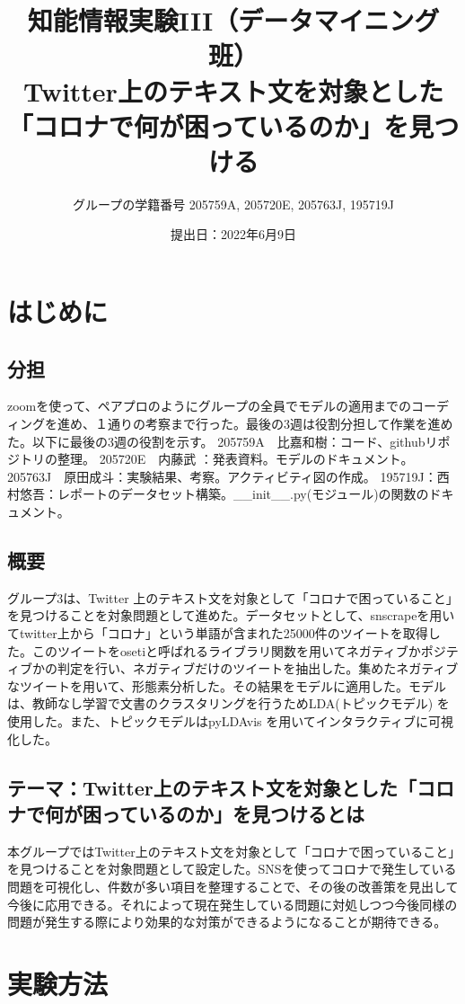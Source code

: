 \documentclass[a4paper, 11pt, titlepage]{jsarticle}
\title{知能情報実験III（データマイニング班）\\Twitter上のテキスト文を対象とした「コロナで何が困っているのか」を見つける}
\author{グループの学籍番号 205759A, 205720E, 205763J, 195719J}
\date{提出日：2022年6月9日}
\begin{document}
\maketitle
\tableofcontents
\clearpage

\section{はじめに}

\subsection{分担}
zoomを使って、ペアプロのようにグループの全員でモデルの適用までのコーディングを進め、１通りの考察まで行った。最後の3週は役割分担して作業を進めた。以下に最後の3週の役割を示す。
205759A　比嘉和樹：コード、githubリポジトリの整理。
205720E　内藤武   ：発表資料。モデルのドキュメント。
205763J　原田成斗：実験結果、考察。アクティビティ図の作成。
195719J：西村悠吾：レポートのデータセット構築。\_\_init\_\_.py(モジュール)の関数のドキュメント。


\subsection{概要}
グループ3は、Twitter 上のテキスト文を対象として「コロナで困っていること」を見つけることを対象問題として進めた。データセットとして、snscrapeを用いてtwitter上から「コロナ」という単語が含まれた25000件のツイートを取得した。このツイートをosetiと呼ばれるライブラリ関数を用いてネガティブかポジティブかの判定を行い、ネガティブだけのツイートを抽出した。集めたネガティブなツイートを用いて、形態素分析した。その結果をモデルに適用した。モデルは、教師なし学習で文書のクラスタリングを行うためLDA(トピックモデル) を使用した。また、トピックモデルはpyLDAvis を用いてインタラクティブに可視化した。

\subsection{テーマ：Twitter上のテキスト文を対象とした「コロナで何が困っているのか」を見つけるとは}
本グループではTwitter上のテキスト文を対象として「コロナで困っていること」を見つけることを対象問題として設定した。SNSを使ってコロナで発生している問題を可視化し、件数が多い項目を整理することで、その後の改善策を見出して今後に応用できる。それによって現在発生している問題に対処しつつ今後同様の問題が発生する際により効果的な対策ができるようになることが期待できる。

\section{実験方法}
\end{document}
